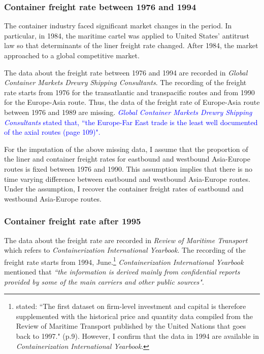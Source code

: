 \subsubsection{Container freight rate between 1976 and 1994}

The container industry faced significant market changes in the period. In particular, in 1984, the maritime cartel was applied to United States' antitrust law so that determinants of the liner freight rate changed. After 1984, the market approached to a global competitive market. 

The data about the freight rate between 1976 and 1994 are recorded in \textit{Global Container Markets Drewry Shipping Consultants}. The recording of the freight rate starts from 1976 for the transatlantic and transpacific routes and from 1990 for the Europe-Asia route. Thus, the data of the freight rate of Europe-Asia route between 1976 and 1989 are missing. \textcolor{blue}{\textit{Global Container Markets Drewry Shipping Consultants} stated that, ``the Europe-Far East trade is the least well documented of the axial routes (page 109)".}

For the imputation of the above missing data, I assume that the proportion of the liner and container freight rates for eastbound and westbound Asia-Europe routes is fixed between 1976 and 1990. This assumption implies that there is no time varying difference between eastbound and westbound Asia-Europe routes. Under the assumption, I recover the container freight rates of eastbound and westbound Asia-Europe routes.



\subsubsection{Container freight rate after 1995}\label{subsec:freight_rate_after_1995}

The data about the freight rate are recorded in \textit{Review of Maritime Transport} which refers to \textit{Containerization International Yearbook}. The recording of the freight rate starts from 1994, June.\footnote{\cite{jeon2017learning} stated: ``The first dataset on firm-level investment and capital is therefore supplemented with the historical price and quantity data compiled from the Review of Maritime Transport published by the United Nations that goes back to 1997." (p.9). However, I confirm that the data in 1994 are available in \textit{Containerization International Yearbook}.} \textit{Containerization International Yearbook} mentioned that \textit{``the information is derived mainly from confidential reports provided by some of the main carriers and other public sources"}. 

